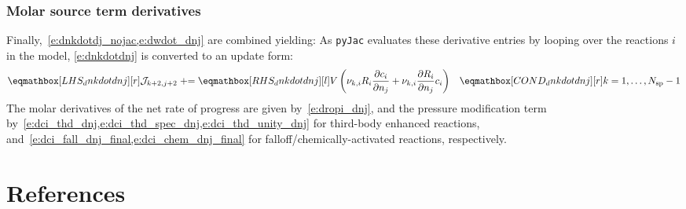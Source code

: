 \documentclass[12pt,number,sort&compress]{elsarticle}
\begin{document}
\subsubsection{Molar source term derivatives}
Finally,~\cref{e:dnkdotdj_nojac,e:dwdot_dnj} are combined yielding:
As \texttt{pyJac} evaluates these derivative entries by looping over the reactions $i$ in the model, \cref{e:dnkdotdnj} is converted to an update form:
\begin{align}
 \lhs{dnkdotdnj}{\mathcal{J}_{k + 2, j + 2}} &\pluseq/ \rhs{dnkdotdnj}{V \left(\nu_{k,i} R_{i} \frac{\partial c_{i} }{\partial {n_j} } + \nu_{k,i} \frac{\partial R_{i} }{\partial {n_j} } c_{i}\right)} & \mathcond{dnkdotdnj}{k = 1, \ldots, \ns/ - 1}
\end{align}
The molar derivatives of the net rate of progress are given by~\cref{e:dropi_dnj}, and the pressure modification term by~\cref{e:dci_thd_dnj,e:dci_thd_spec_dnj,e:dci_thd_unity_dnj} for third-body enhanced reactions, and~\cref{e:dci_fall_dnj_final,e:dci_chem_dnj_final} for falloff\slash chemically-activated reactions, respectively.


\pagebreak
\section{References}


\end{document}
